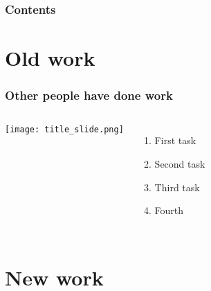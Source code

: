 \begin{frame}
    \frametitle{Contents}

    \tableofcontents

\end{frame}

\section{Old work}

\begin{frame}
    \frametitle{Other people have done work}

    \begin{columns}
            \centering 
            \texttt{[image: title\_slide.png]}
        

            \begin{enumerate}
                \item First task
                \item Second task
                \item Third task
                \item Fourth
            \end{enumerate}

    \end{columns}

\end{frame}


\section{New work} \sectionpage

